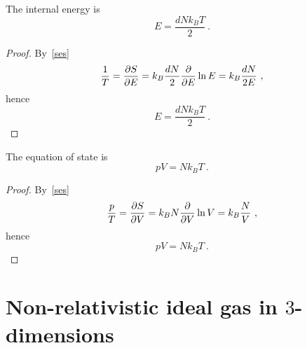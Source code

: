     The internal energy is 
    \begin{equation*}
        E = \frac{d N k_B T}{2} ~.
    \end{equation*}
    \begin{proof}
        By~\eqref{ses}
        \begin{equation*}
            \frac{1}{T} = \frac{\partial S}{\partial E} = k_B \frac{dN}{2} \frac{\partial}{\partial E} \ln E = k_B \frac{dN}{2E} ~,
        \end{equation*}
        hence 
        \begin{equation*}
            E = \frac{d N k_B T}{2} ~.
        \end{equation*}
    \end{proof}

    The equation of state is  
    \begin{equation*}
        p V = N k_B T ~.
    \end{equation*}
    \begin{proof}
        By~\eqref{ses}
        \begin{equation*}
            \frac{p}{T} = \frac{\partial S}{\partial V} = k_B N \frac{\partial}{\partial V} \ln V = k_B \frac{N}{V}  ~,
        \end{equation*}
        hence 
        \begin{equation*}
            pV = N k_B T ~.
        \end{equation*}
    \end{proof}

\section{Non-relativistic ideal gas in $3$-dimensions}

